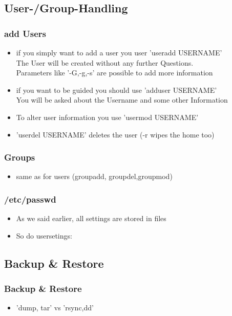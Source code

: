 \documentclass[hyperref={pdfpagelabels=false}]{beamer}
\begin{document}
    \subsection{User-/Group-Handling}
	    \begin{frame}
			\frametitle{add Users}
			\begin{itemize}
                \item<1-> if you simply want to add a user you user 'useradd USERNAME' \\
                          The User will be created without any further Questions. \\
                          Parameters like '-G,-g,-s' are possible to add more information
                \item<2-> if you want to be guided you should use 'adduser USERNAME' \\
                         You will be asked about the Username and some other Information
                \item<3-> To alter user information you use 'usermod USERNAME'
                \item<4-> 'userdel USERNAME' deletes the user (-r wipes the home too)
            \end{itemize}
		\end{frame}
	    \begin{frame}
			\frametitle{Groups}
			\begin{itemize}
                \item<1-> same as for users (groupadd, groupdel,groupmod) 
            \end{itemize}
		\end{frame}
	    \begin{frame}
			\frametitle{/etc/passwd}
			\begin{itemize}
                \item<1-> As we said earlier, all settings are stored in files
                \item<1-> So do usersetings:
            \end{itemize}
		\end{frame}
    \subsection{Backup \& Restore}
	    \begin{frame}
			\frametitle{Backup \& Restore}
			\begin{itemize}
                \item<2-> 'dump, tar' vs 'rsync,dd'
            \end{itemize}
		\end{frame}
\end{document}
